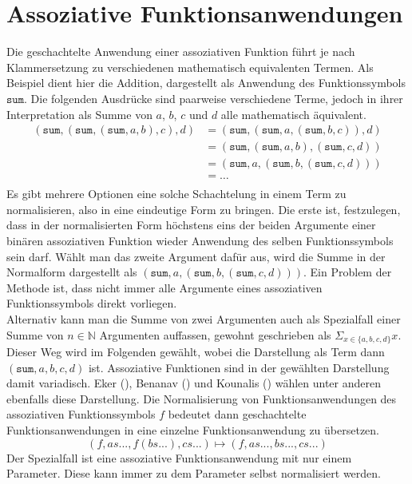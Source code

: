\section {Assoziative Funktionsanwendungen}
Die geschachtelte Anwendung einer assoziativen Funktion führt je nach Klammersetzung zu verschiedenen mathematisch equivalenten Termen. Als Beispiel dient hier die Addition, dargestellt als Anwendung des Funktionssymbols $\texttt{sum}$. Die folgenden Ausdrücke sind paarweise verschiedene Terme, jedoch in ihrer Interpretation als Summe von $a$, $b$, $c$ und $d$ alle mathematisch äquivalent.
\begin{equation*}
	\begin{split}
	   (\texttt{sum}, (\texttt{sum}, (\texttt{sum}, a, b), c), d) 
    &= (\texttt{sum}, (\texttt{sum}, a, (\texttt{sum}, b, c)), d)\\
	&= (\texttt{sum}, (\texttt{sum}, a, b), (\texttt{sum}, c, d))\\
	&= (\texttt{sum}, a, (\texttt{sum}, b, (\texttt{sum}, c, d)))\\
	&= \dots \\
	\end{split}
\end{equation*}
Es gibt mehrere Optionen eine solche Schachtelung in einem Term zu normalisieren, also in eine eindeutige Form zu bringen. Die erste ist, festzulegen, dass in der normalisierten Form höchstens eins der beiden Argumente einer binären assoziativen Funktion wieder Anwendung des selben Funktionssymbols sein darf. Wählt man das zweite Argument dafür aus, wird die Summe in der Normalform dargestellt als $(\texttt{sum}, a, (\texttt{sum}, b, (\texttt{sum}, c, d)))$. Ein Problem der Methode ist, dass nicht immer alle Argumente eines assoziativen Funktionssymbols direkt vorliegen.\\
Alternativ kann man die Summe von zwei Argumenten auch als Spezialfall einer Summe von $n \in \mathbb{N}$ Argumenten auffassen, gewohnt geschrieben als $\Sigma_{x \in \{a, b, c, d\}} x$. Dieser Weg wird im Folgenden gewählt, wobei die Darstellung als Term dann $(\texttt{sum}, a, b, c, d)$ ist. Assoziative Funktionen sind in der gewählten Darstellung damit variadisch. Eker (\cite{BipartiteGraphMatching}), Benanav (\cite{NPHardMatching}) und Kounalis (\cite{ACPatternCompiler}) wählen unter anderen ebenfalls diese Darstellung. 
Die Normalisierung von Funktionsanwendungen des assoziativen Funktionssymbols $f$ bedeutet dann geschachtelte Funktionsanwendungen in eine einzelne Funktionsanwendung zu übersetzen. 
$$(f, as..., f(bs...), cs...) \mapsto (f, as..., bs..., cs...)$$
Der Spezialfall ist eine assoziative Funktionsanwendung mit nur einem Parameter. Diese kann immer zu dem Parameter selbst normalisiert werden. 

